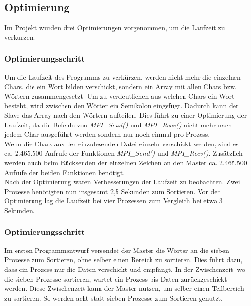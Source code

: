 \subsection{Optimierung}
Im Projekt wurden drei Optimierungen vorgenommen, um die Laufzeit zu verkürzen.\\

\subsubsection{Optimierungsschritt}
Um die Laufzeit des Programms zu verkürzen, werden nicht mehr die einzelnen Chars, die ein Wort bilden verschickt, sondern ein Array  mit allen Chars bzw. Wörtern zusammengesetzt. Um zu verdeutlichen aus welchen Chars ein Wort besteht, wird zwischen den Wörter ein Semikolon eingefügt. Dadurch kann der Slave das Array nach den Wörtern aufteilen. Dies führt zu einer Optimierung der Laufzeit, da die Befehle von \textit{MPI\_Send()} und \textit{MPI\_Recv()} nicht mehr nach jedem Char ausgeführt werden sondern nur noch einmal pro Prozess. \\
Wenn die Chars aus der einzulesenden Datei einzeln verschickt werden, sind es ca. 2.465.500 Aufrufe der Funktionen \textit{MPI\_Send()} und \textit{MPI\_Recv()}. Zusätzlich werden auch beim Rücksenden der einzelnen Zeichen an den Master ca. 2.465.500 Aufrufe der beiden Funktionen benötigt.\\
Nach der Optimierung waren Verbesserungen der Laufzeit zu beobachten. Zwei Prozesse benötigten nun insgesamt 2,5 Sekunden zum Sortieren. Vor der Optimierung lag die Laufzeit bei vier Prozessen zum Vergleich bei etwa 3 Sekunden.  

\subsubsection{Optimierungsschritt}
Im ersten Programmentwurf versendet der Master die Wörter an die sieben Prozesse zum Sortieren, ohne selber einen Bereich zu sortieren. Dies führt dazu, dass ein Prozess nur die Daten verschickt und empfängt. In der Zwischenzeit, wo die sieben Prozesse sortieren, wartet ein Prozess bis Daten zurückgeschickt werden. Diese Zwischenzeit kann der Master nutzen, um selber einen Teilbereich zu sortieren. So werden acht statt sieben Prozesse zum Sortieren genutzt.  

